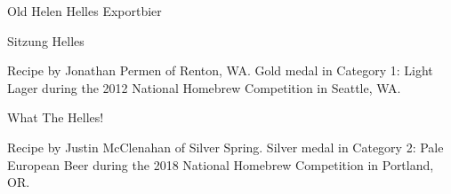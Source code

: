 \begin{recipe}{Old Helen Helles Exportbier}
\begin{recipe}{Sitzung Helles}
\begin{aboutblock}
Recipe by Jonathan Permen of Renton, WA. Gold medal in Category 1: Light Lager
during the 2012 National Homebrew Competition in Seattle, WA.
\sourceaha
\end{aboutblock}


\begin{methodandtiming}

\begin{mashsteps}
\end{mashsteps}

\begin{fermentationsteps}
\end{fermentationsteps}

\end{methodandtiming}

\recipebreak

\begin{ingredientsblock}

\begin{malts}
\end{malts}

\begin{hops}
\end{hops}


\end{ingredientsblock}

\end{recipe}

\begin{recipe}{What The Helles!} %

\begin{aboutblock}
Recipe by Justin McClenahan of Silver Spring. Silver medal in Category 2: Pale
European Beer during the 2018 National Homebrew Competition in Portland, OR.
\sourceaha
\end{aboutblock}



\end{recipe}
\end{recipe}
